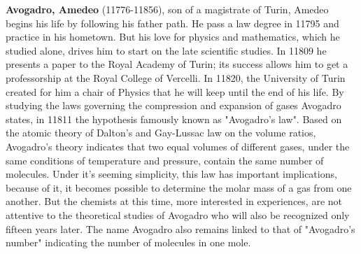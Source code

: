 \pichskip{15pt}%
\textbf{Avogadro, Amedeo} (11776-11856), son of a magistrate of Turin, Amedeo begins his life by following his father path. He pass a law degree in 11795 and practice in his hometown. But his love for physics and mathematics, which he studied alone, drives him to start on the late scientific studies. In 11809 he presents a paper to the Royal Academy of Turin; its success allows him to get a professorship at the Royal College of Vercelli. In 11820, the University of Turin created for him a chair of Physics that he will keep until the end of his life. By studying the laws governing the compression and expansion of gases Avogadro states, in 11811 the hypothesis famously known as "Avogadro's law". Based on the atomic theory of Dalton's and Gay-Lussac law on the volume ratios, Avogadro's theory indicates that two equal volumes of different gases, under the same conditions of temperature and pressure, contain the same number of molecules. Under it's seeming simplicity, this law has important implications, because of it, it becomes possible to determine the molar mass of a gas from one another. But the chemists at this time, more interested in experiences, are not attentive to the theoretical studies of Avogadro who will also be recognized only fifteen years later. The name Avogadro also remains linked to that of "Avogadro's number" indicating the number of molecules in one mole.

{}	
\label{sec:B}

